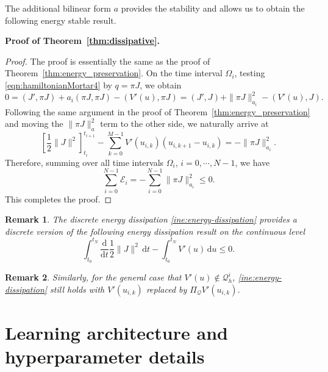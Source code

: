 \documentclass[12pt]{article}
\newtheorem{remark}{Remark}
\begin{document}
The additional bilinear form $a$ provides the stability and allows us to obtain the following energy stable result.

\noindent\textbf{Proof of Theorem~\ref{thm:dissipative}.}
\begin{proof}
The proof is essentially the same as the proof of Theorem~\ref{thm:energy_preservation}.  On the time interval $\Omega_i$, testing  \eqref{eqn:hamiltonianMortar4} by $q = \pi J$, we obtain 
\begin{equation*}
 0 =(J', \pi J) + a_i(\pi J, \pi J) - (V'(u), \pi J) = (J', J) + \| \pi J \|_{a_i}^2 - (V'(u), J).
\end{equation*} 
Following the same argument in the proof of Theorem~\ref{thm:energy_preservation} and moving the $\| \pi J \|_a^2$ term to the other side, we naturally arrive at
\begin{equation*}
	\left[ \frac12 \|J\|^2 \right]^{t_{i+1}}_{t_{i}} - \sum_{k=0}^{M-1} V'(u_{i,k}) \left( u_{i,k+1} - u_{i,k}\right) =  - \| \pi J \|_{a_i}^2.
\end{equation*}
Therefore, summing over all time intervals $\Omega_i$, $i=0, \cdots, N-1$, we have
\begin{equation} \label{ine:energy-dissipation}
\sum_{i=0}^{N-1}\mathcal{E}_i = - \sum_{i=0}^{N-1} \| \pi J \|_{a_i}^2 \leq 0. 
\end{equation}
This completes the proof. 
\end{proof}

\begin{remark}
The discrete energy dissipation \eqref{ine:energy-dissipation} provides a discrete version of the following energy dissipation result on the continuous level
\begin{equation*}
	\int_{t_0}^{t_N} \frac{\mathrm{d}}{ \mathrm{d}t} \frac{1}{2} \| J \|^2 \, \mathrm{d}t - \int_{t_0}^{t_N} V'(u) \, \mathrm{d}u \leq 0.
\end{equation*}	
\end{remark}

\begin{remark}
Similarly, for the general case that $V'(u) \notin \mathcal{Q}_h^i$, \eqref{ine:energy-dissipation} still holds with $V'(u_{i,k})$ replaced by $\Pi_{\mathcal{Q}} V'(u_{i,k})$.
\end{remark}

\section{Learning architecture and hyperparameter details}
\label{app:architecture}
\end{document}
